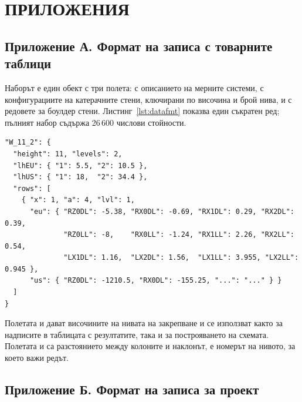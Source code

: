 \section*{ПРИЛОЖЕНИЯ}
\label{sec:appendix}

\subsection*{Приложение А. Формат на записа с товарните таблици}

Наборът е един обект с три полета:  с описанието на мерните системи,
 с конфигурациите на катерачните стени, ключирани по височина и брой нива,
и  с редовете за боулдер стени. Листинг~\ref{lst:datafmt} показва един
съкратен ред; пълният набор съдържа 26\,600 числови стойности.

\begin{lstlisting}[language=JSONlang,caption={Съкратен запис на една конфигурация},label={lst:datafmt}]
"W_11_2": {
  "height": 11, "levels": 2,
  "lhEU": { "1": 5.5, "2": 10.5 },
  "lhUS": { "1": 18,  "2": 34.4 },
  "rows": [
    { "x": 1, "a": 4, "lvl": 1,
      "eu": { "RZ0DL": -5.38, "RX0DL": -0.69, "RX1DL": 0.29, "RX2DL": 0.39,
              "RZ0LL": -8,    "RX0LL": -1.24, "RX1LL": 2.26, "RX2LL": 0.54,
              "LX1DL": 1.16,  "LX2DL": 1.56,  "LX1LL": 3.955, "LX2LL": 0.945 },
      "us": { "RZ0DL": -1210.5, "RX0DL": -155.25, "...": "..." } }
  ]
}
\end{lstlisting}

Полетата  и  дават височините на нивата на закрепване и се
използват както за надписите в таблицата с резултатите, така и за построяването на
схемата. Полетата  и  са разстоянието между колоните и наклонът,
 е номерът на нивото, за което важи редът.
\newpage
\subsection*{Приложение Б. Формат на записа за проект}

